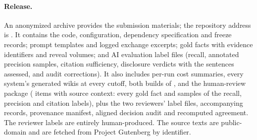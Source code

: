 \paragraph{Release.} An anonymized archive provides the submission materials; the repository
address is \anonrepo. It contains the code, configuration, dependency specification and freeze records;
prompt templates and logged exchange excerpts; gold facts with evidence identifiers and reveal volumes;
and AI evaluation label files
(recall, annotated precision samples, citation sufficiency, disclosure verdicts with the
sentences assessed, and audit corrections). It also includes per-run cost summaries, every
system's generated wikis at every cutoff, both builds of \sys, and the human-review package
( items with source context: every gold fact and samples of the recall,
precision and citation labels), plus the two reviewers' label files, accompanying records,
provenance manifest, aligned decision audit and recomputed agreement. The reviewer labels
are entirely human-produced. The source texts
are public-domain and are fetched from Project Gutenberg by identifier.
